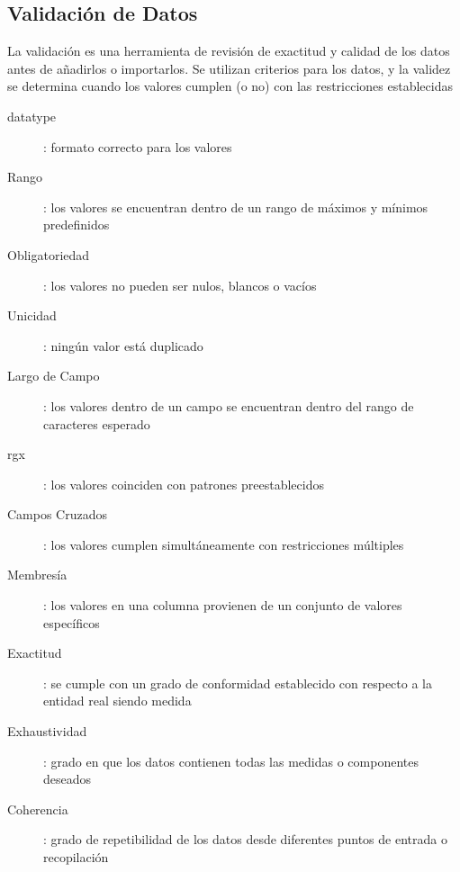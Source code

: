 \subsection{Validación de Datos}
La validación es una herramienta de revisión de exactitud y calidad de los datos antes de añadirlos o importarlos. Se utilizan criterios para los datos, y la validez se determina cuando los valores cumplen (o no) con las restricciones establecidas
\begin{description}
    \item [\gls{datatype}]{ : formato correcto para los valores}
    \item [Rango]{ : los valores se encuentran dentro de un rango de máximos y mínimos predefinidos}
    \item [Obligatoriedad]{ : los valores no pueden ser nulos, blancos o vacíos}
    \item [Unicidad]{ : ningún valor está duplicado}
    \item [Largo de Campo]{ : los valores dentro de un campo se encuentran dentro del rango de caracteres esperado}
    \item [\gls{rgx}]{ : los valores coinciden con patrones preestablecidos}
    \item [Campos Cruzados]{ : los valores cumplen simultáneamente con restricciones múltiples}
    \item [Membresía]{ : los valores en una columna provienen de un conjunto de valores específicos} 
    \item [Exactitud]{ : se cumple con un grado de conformidad establecido con respecto a la entidad real siendo medida}
    \item [Exhaustividad]{ : grado en que los datos contienen todas las medidas o componentes deseados}
    \item [Coherencia]{ : grado de repetibilidad de los datos desde diferentes puntos de entrada o recopilación}
\end{description}

\newpage